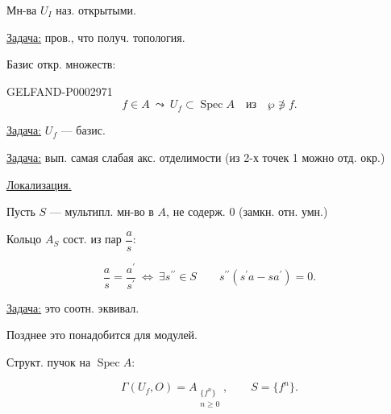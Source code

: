 Мн-ва $U_I$ наз. открытыми.



\hfill{}

\underline{Задача:} пров., что получ. топология.

Базис откр. множеств:

\begin{GelfandAdjacentEvidence}{GELFAND-P000297}{1}
\begin{equation*}f\in A\ \leadsto\ U_f\subset\operatorname{Spec}A\quad\text{из}\quad\wp\not\ni f.\end{equation*}

\end{GelfandAdjacentEvidence}


\underline{Задача:} $U_f$ --- базис.

\underline{Задача:} вып. самая слабая акс. отделимости
(из 2-х точек 1 можно отд. окр.)

\underline{Локализация.}

Пусть $S$ --- мультипл. мн-во в $A$, не содерж. $0$ (замкн. отн. умн.)

Кольцо $A_S$ сост. из пар $\dfrac a s$:

\begin{equation*}\frac a s=\frac{a^{\prime}}{s^{\prime}}\ \Longleftrightarrow\ \exists s^{\prime\prime}\in S\qquad s^{\prime\prime}(s^{\prime}a-sa^{\prime})=0.\end{equation*}

\underline{Задача:} это соотн. эквивал.

Позднее это понадобится для модулей.

Структ. пучок на $\operatorname{Spec}A$:

\begin{equation*}\Gamma(U_f,O)=A_{\substack{\{f^n\}\\n\ge0}},\qquad S=\{f^n\}.\end{equation*}

